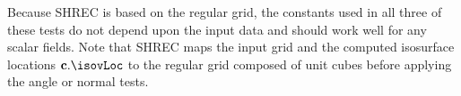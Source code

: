 Because SHREC is based on the regular grid,
the constants used in all three of these tests do not depend 
upon the input data and should work well for any scalar fields.
Note that SHREC maps the input grid 
and the computed isosurface locations $\cb.\isovLoc$
to the regular grid composed of unit cubes
before applying the angle or normal tests.
